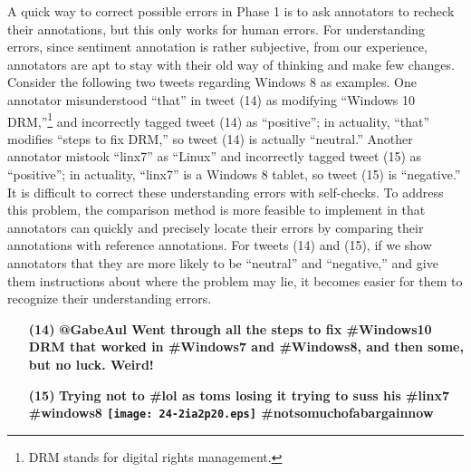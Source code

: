 \documentclass[english]{jnlp_1.4}
\begin{document}
A quick way to correct possible errors in Phase 1 is to ask annotators to recheck their annotations, but this only works for human errors. For understanding errors, since sentiment annotation is rather subjective, from our experience, annotators are apt to stay with their old way of thinking and make few changes. Consider the following two tweets regarding Windows 8 as examples. One annotator misunderstood ``that'' in tweet (14) as modifying ``Windows 10 DRM,''\footnote{DRM stands for digital rights management.} and incorrectly tagged tweet (14) as ``positive''; in actuality, ``that'' modifies ``steps to fix DRM,'' so tweet (14) is actually ``neutral.'' Another annotator mistook ``linx7'' as ``Linux'' and incorrectly tagged tweet (15) as ``positive''; in actuality, ``linx7'' is a Windows 8 tablet, so tweet (15) is ``negative.'' It is difficult to correct these understanding errors with self-checks. To address this problem, the comparison method is more feasible to implement in that annotators can quickly and precisely locate their errors by comparing their annotations with reference annotations. For tweets (14) and (15), if we show annotators that they are more likely to be ``neutral'' and ``negative,'' and give them instructions about where the problem may lie, it becomes easier for them to recognize their understanding errors.

\begin{enumerate}
\item[{\bf (14)}] {\bf @GabeAul Went through all the steps to fix \#Windows10 DRM that worked in \#Windows7 and \#Windows8, and then some, but no luck. Weird!}
\item[{\bf (15)}] {\bf Trying not to \#lol as toms losing it trying to suss his \#linx7 \#windows8  \texttt{[image: 24-2ia2p20.eps]} \#notsomuchofabargainnow} 
\end{enumerate}
\end{document}
